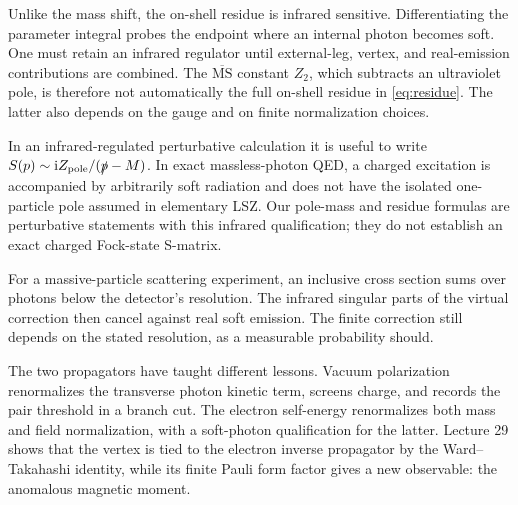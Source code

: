 \documentclass[11pt]{article}
\newcommand{\ii}{\mathrm i}
\newcommand{\MSbar}{\overline{\mathrm{MS}}}
\begin{document}
Unlike the mass shift, the on-shell residue is infrared sensitive.
Differentiating the parameter integral probes the endpoint where an
internal photon becomes soft. One must retain an infrared regulator
until external-leg, vertex, and real-emission contributions are combined.
The \(\MSbar\) constant \(Z_2\), which subtracts an ultraviolet pole, is
therefore not automatically the full on-shell residue in \eqref{eq:residue}.
The latter also depends on the gauge and on finite normalization choices.

\begin{keyidea}
In an infrared-regulated perturbative calculation it is useful to write
\(S(p)\sim\ii Z_{\rm pole}/(\slashed p-M)\). In exact massless-photon QED,
a charged excitation is accompanied by arbitrarily soft radiation and
does not have the isolated one-particle pole assumed in elementary LSZ.
Our pole-mass and residue formulas are perturbative statements with this
infrared qualification; they do not establish an exact charged Fock-state
S-matrix.
\end{keyidea}
For a massive-particle scattering experiment, an inclusive cross section
sums over photons below the detector's resolution. The infrared singular
parts of the virtual correction then cancel against real soft emission.
The finite correction still depends on the stated resolution, as a
measurable probability should.

The two propagators have taught different lessons. Vacuum polarization
renormalizes the transverse photon kinetic term, screens charge, and
records the pair threshold in a branch cut. The electron self-energy
renormalizes both mass and field normalization, with a soft-photon
qualification for the latter. Lecture 29 shows that the vertex is tied
to the electron inverse propagator by the Ward--Takahashi identity, while
its finite Pauli form factor gives a new observable: the anomalous
magnetic moment.
\end{document}
